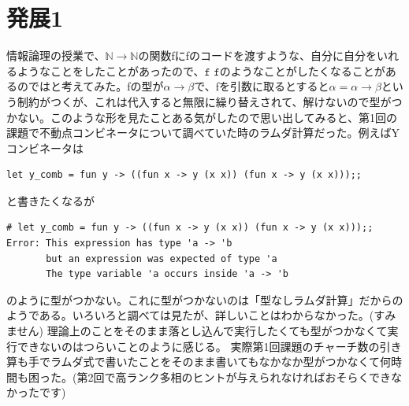 \documentclass[11pt,a4paper]{jsarticle}
\begin{document}
\section*{発展1}
情報論理の授業で、$\mathbb{N}\rightarrow\mathbb{N}$の関数fにfのコードを渡すような、自分に自分をいれるようなことをしたことがあったので、$\texttt{f f}$のようなことがしたくなることがあるのではと考えてみた。fの型が$\alpha\rightarrow\beta$で、fを引数に取るとすると$\alpha=\alpha\rightarrow\beta$という制約がつくが、これは代入すると無限に繰り替えされて、解けないので型がつかない。このような形を見たことある気がしたので思い出してみると、第1回の課題で不動点コンビネータについて調べていた時のラムダ計算だった。例えばYコンビネータは
\begin{lstlisting}[basicstyle=\ttfamily\footnotesize, frame=single]
let y_comb = fun y -> ((fun x -> y (x x)) (fun x -> y (x x)));;
\end{lstlisting}
と書きたくなるが
\begin{lstlisting}[basicstyle=\ttfamily\footnotesize, frame=single]
# let y_comb = fun y -> ((fun x -> y (x x)) (fun x -> y (x x)));;
Error: This expression has type 'a -> 'b
       but an expression was expected of type 'a
       The type variable 'a occurs inside 'a -> 'b
\end{lstlisting}
のように型がつかない。これに型がつかないのは「型なしラムダ計算」だからのようである。いろいろと調べては見たが、詳しいことはわからなかった。(すみません)
理論上のことをそのまま落とし込んで実行したくても型がつかなくて実行できないのはつらいことのように感じる。
実際第1回課題のチャーチ数の引き算も手でラムダ式で書いたことをそのまま書いてもなかなか型がつかなくて何時間も困った。(第2回で高ランク多相のヒントが与えられなければおそらくできなかったです)
\end{document}
